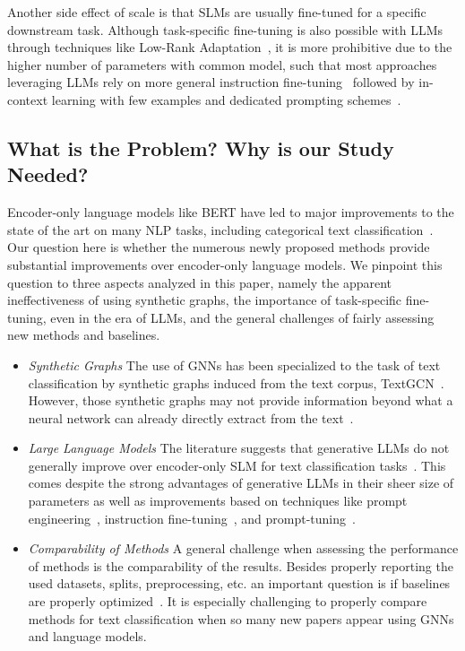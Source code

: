 \documentclass[acmsmall,nonacm]{acmart}
\newcommand{\SLM}{SLM\xspace}
\newcommand{\SLMs}{SLMs\xspace}
\newcommand{\LLMs}{LLMs\xspace}
\begin{document}
Another side effect of scale is that \SLMs are usually fine-tuned for a specific downstream task. Although task-specific fine-tuning is also possible with \LLMs through techniques like Low-Rank Adaptation~\cite{lora}, it is more prohibitive due to the higher number of parameters with common model, such that most approaches leveraging \LLMs rely on more general instruction fine-tuning~\cite{ouyangTrainingLanguageModels2022} followed by in-context learning with few examples and dedicated prompting schemes~\cite{carp}.

\subsection{What is the Problem? Why is our Study Needed?}

Encoder-only language models like BERT have led to major improvements to the state of the art on many NLP tasks, including categorical text classification~\cite{galke2023really,galkescherp-acl2022}.
Our question here is whether the numerous newly proposed methods provide substantial improvements over encoder-only language models. 
We pinpoint this question to three aspects analyzed in this paper, namely the apparent ineffectiveness of using synthetic graphs, the importance of task-specific fine-tuning, even in the era of  \LLMs, and the general challenges of fairly assessing new methods and baselines.

\begin{itemize}
    \item  \textit{Synthetic Graphs}
The use of GNNs has been specialized to the task of text classification by synthetic graphs induced from the text corpus, \eg TextGCN~\cite{DBLP:conf/aaai/YaoM019}.
However, those synthetic graphs may not provide information beyond what a neural network can already directly extract from the text~\cite{galkescherp-acl2022}.

\item \textit{Large Language Models}
The literature suggests that generative \LLMs do not generally improve over encoder-only \SLM for text classification tasks~\cite{DBLP:journals/corr/abs-2402-07470-pushing-the-limit,
carp,
yuan2023revisiting,
li2023chatgpt,
yu2023open}.
This comes despite the strong advantages of generative \LLMs in their sheer size of parameters as well as improvements based on techniques like prompt engineering~\cite{carp,chain-of-thought}, 
instruction fine-tuning~\cite{wei2022finetuned}, and prompt-tuning~\cite{liu-etal-2022-p,lester-etal-2021-power}.

\item \textit{Comparability of Methods}
A general challenge when assessing the performance of methods is the comparability of the results.
Besides properly reporting the used datasets, splits, preprocessing, etc. an important question is if baselines are properly optimized~\cite{DBLP:conf/recsys/DacremaCJ19,leech2024questionablepracticesmachinelearning}. 
It is especially challenging to properly compare methods for text classification when so many new papers appear using GNNs and language models.
\end{itemize}
\end{document}
